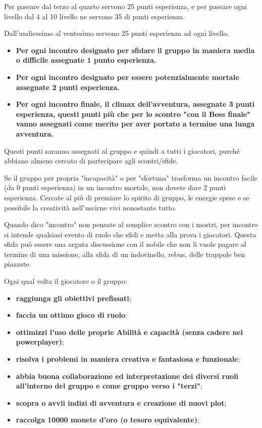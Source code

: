 \documentclass[a4paper,11pt,twoside,openany]{book}
\begin{document}
Per passare dal terzo al quarto servono 25 punti esperienza, e per passare ogni livello dal 4 al 10 livello ne servono 35 di punti esperienza.

Dall'undicesimo al ventesimo servono 25 punti esperienza ad ogni livello.
\medskip
\begin{itemize}
\item
\textbf{Per ogni incontro designato per sfidare il gruppo in maniera media o difficile assegnate 1 punto esperienza.}
\item
\textbf{Per ogni incontro designato per essere potenzialmente mortale assegnate 2 punti esperienza.}
\item
\textbf{Per ogni incontro finale, il climax dell'avventura, assegnate 3 punti esperienza, questi punti più che per lo scontro "con il Boss finale" vanno assegnati come merito per aver portato a termine una lunga avventura.}
\end{itemize}

Questi punti saranno assegnati al gruppo e quindi a tutti i giocatori, purché abbiano almeno cercato di partecipare agli scontri/sfide.

Se il gruppo per propria "incapacità" o per "sfortuna" trasforma un incontro facile (da 0 punti esperienza) in un incontro mortale, non dovete dare 2 punti esperienza. Cercate al più di premiare lo spirito di gruppo, le energie spese e se possibile la creatività nell'uscirne vivi  nonostante tutto.

Quando dico "incontro" non pensate al semplice scontro con i mostri, per incontro si intende qualsiasi evento di ruolo che sfidi e metta alla prova i giocatori. Questa sfida può essere una arguta discussione con il nobile che non li vuole pagare al termine di una missione, alla sfida di un indovinello, rebus, delle trappole ben piazzate.

\bigskip

Ogni qual volta il giocatore o il gruppo:
\begin{itemize}
	\item
	      \textbf{raggiunga gli obiettivi prefissati};
	\item
	      \textbf{faccia un ottimo gioco di ruolo};
	\item
	      \textbf{ottimizzi l'uso delle proprie Abilità e capacità (senza cadere nel powerplayer)};
	\item
	      \textbf{risolva i problemi in maniera creativa e fantasiosa e funzionale};
	\item
	      \textbf{abbia buona collaborazione ed interpretazione dei diversi ruoli all'interno del gruppo e come gruppo verso i "terzi"};
	\item
	      \textbf{scopra o avvii indizi di avventura e creazione di nuovi plot};
	\item
	      \textbf{raccolga 10000 monete d'oro (o tesoro equivalente)};
\end{itemize}
\end{document}
